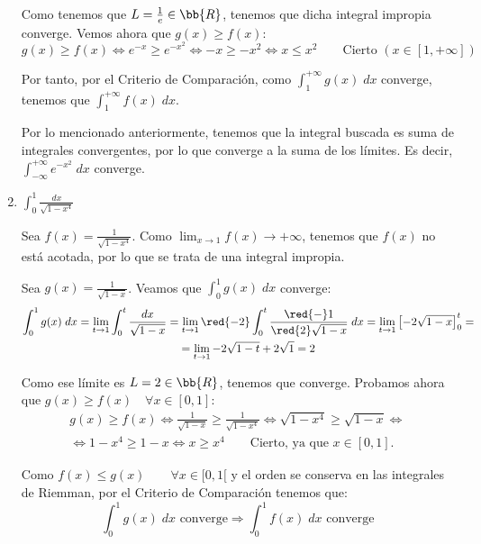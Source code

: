 \begin{ejercicio}
\begin{enumerate}
    Como tenemos que $L=\frac{1}{e}\in \bb{R}$, tenemos que dicha integral impropia converge. Vemos ahora que $g(x)\geq f(x)$:
    \begin{equation*}
        g(x)\geq f(x)
        \Longleftrightarrow 
        e^{-x} \geq e^{-x^2}
        \Longleftrightarrow
        -x \geq -x^2
        \Longleftrightarrow
        x \leq x^2 \qquad \text{Cierto } (x\in [1,+\infty])
    \end{equation*}

    Por tanto, por el Criterio de Comparación, como $\int_1^{+\infty}g(x)\;dx$ converge, tenemos que $\int_1^{+\infty}f(x)\;dx$.

    Por lo mencionado anteriormente, tenemos que la integral buscada es suma de integrales convergentes, por lo que converge a la suma de los límites. Es decir, $\displaystyle \int_{-\infty}^{+\infty} e^{-x^2}\;dx$ converge.

    
    \item $\displaystyle \int_0^1 \frac{dx}{\sqrt{1-x^4}}$

    Sea $\displaystyle f(x)=\frac{1}{\sqrt{1-x^4}}$. Como $\displaystyle \lim_{x\to 1}f(x)\to +\infty$, tenemos que $f(x)$ no está acotada, por lo que se trata de una integral impropia.

    Sea $g(x)=\frac{1}{\sqrt{1-x}}$. Veamos que $\int_0^1 g(x)\;dx$ converge:
    \begin{multline*}
        \int_0^1 g(x)\;dx
        = \lim_{t\to 1} \int_0^t \frac{dx}{\sqrt{1-x}}
        = \lim_{t\to 1} \red{-2}\int_0^t \frac{\red{-}1}{\red{2}\sqrt{1-x}}\;dx
        = \lim_{t\to 1} \left[-2\sqrt{1-x}\right]_0^t 
        =\\=
        \lim_{t\to 1} -2\sqrt{1-t} +2\sqrt{1} = 2
    \end{multline*}

    Como ese límite es $L=2\in \bb{R}$, tenemos que converge. Probamos ahora que $g(x)\geq f(x) \quad \forall x\in [0,1]$:
    \begin{multline*}
        g(x)\geq f(x) \Longleftrightarrow \frac{1}{\sqrt{1-x}} \geq \frac{1}{\sqrt{1-x^4}}
        \Longleftrightarrow \sqrt{1-x^4} \geq \sqrt{1-x} \Longleftrightarrow \\ \Longleftrightarrow
        1-x^4\geq 1-x
        \Longleftrightarrow x\geq x^4 \qquad \text{Cierto, ya que $x\in [0,1]$.}
    \end{multline*}

    Como $f(x)\leq g(x) \qquad \forall x\in [0,1[$ y el orden se conserva en las integrales de Riemman, por el Criterio de Comparación tenemos que:
    \begin{equation*}
        \int_0^1 g(x)\;dx \text{ converge} \Longrightarrow 
        \int_0^1 f(x)\;dx \text{ converge}
    \end{equation*}


\end{enumerate}
\end{ejercicio}
